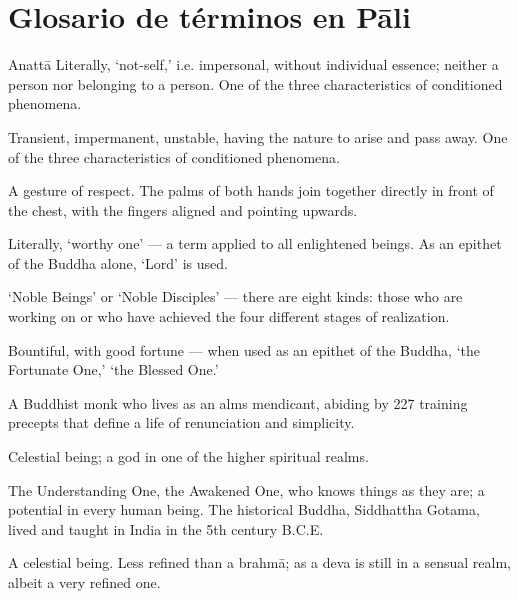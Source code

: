 \chapter{Glosario de términos en Pāli }

\enlargethispage{2\baselineskip}

\begin{description}

Anattā Literally, `not-self,' i.e. impersonal, without individual
  essence; neither a person nor belonging to a person. One of the three
  characteristics of conditioned phenomena.

\item[Anicca] Transient, impermanent, unstable, having the nature to
  arise and pass away. One of the three characteristics of conditioned
  phenomena.

\item[Añjali] A gesture of respect. The palms of both hands join
  together directly in front of the chest, with the fingers aligned and
  pointing upwards.

\item[Arahaṁ/Arahant] Literally, ‘worthy one’ --- a term applied to all
  enlightened beings. As an epithet of the Buddha alone, `Lord' is used.

\item[Ariyapuggalā] ‘Noble Beings’ or ‘Noble Disciples’ --- there are
  eight kinds: those who are working on or who have achieved the four
  different stages of realization.

\item[Bhagavā] Bountiful, with good fortune --- when used as an epithet of
  the Buddha, `the Fortunate One,' `the Blessed One.'

\item[Bhikkhu] A Buddhist monk who lives as an alms mendicant, abiding
  by 227 training precepts that define a life of renunciation and
  simplicity.

\item[Brahmā] Celestial being; a god in one of the higher spiritual
  realms.

\item[Buddha] The Understanding One, the Awakened One, who knows things
  as they are; a potential in every human being. The historical Buddha,
  Siddhattha Gotama, lived and taught in India in the 5th century B.C.E.

\item[Deva] A celestial being. Less refined than a brahmā; as a deva is
  still in a sensual realm, albeit a very refined one.


\end{description}
